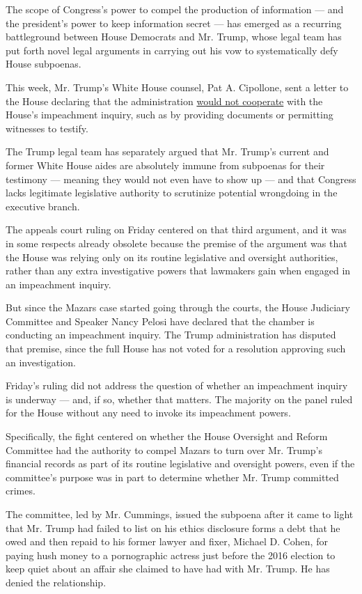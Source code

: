 The scope of Congress's power to compel the production of information
--- and the president's power to keep information secret --- has emerged
as a recurring battleground between House Democrats and Mr. Trump, whose
legal team has put forth novel legal arguments in carrying out his vow
to systematically defy House subpoenas.

This week, Mr. Trump's White House counsel, Pat A. Cipollone, sent a
letter to the House declaring that the administration
\href{https://www.nytimes3xbfgragh.onion/2019/10/08/us/politics/sondland-trump-ukraine-impeach.html}{would
not cooperate} with the House's impeachment inquiry, such as by
providing documents or permitting witnesses to testify.

The Trump legal team has separately argued that Mr. Trump's current and
former White House aides are absolutely immune from subpoenas for their
testimony --- meaning they would not even have to show up --- and that
Congress lacks legitimate legislative authority to scrutinize potential
wrongdoing in the executive branch.

The appeals court ruling on Friday centered on that third argument, and
it was in some respects already obsolete because the premise of the
argument was that the House was relying only on its routine legislative
and oversight authorities, rather than any extra investigative powers
that lawmakers gain when engaged in an impeachment inquiry.

But since the Mazars case started going through the courts, the House
Judiciary Committee and Speaker Nancy Pelosi have declared that the
chamber is conducting an impeachment inquiry. The Trump administration
has disputed that premise, since the full House has not voted for a
resolution approving such an investigation.

Friday's ruling did not address the question of whether an impeachment
inquiry is underway --- and, if so, whether that matters. The majority
on the panel ruled for the House without any need to invoke its
impeachment powers.

Specifically, the fight centered on whether the House Oversight and
Reform Committee had the authority to compel Mazars to turn over Mr.
Trump's financial records as part of its routine legislative and
oversight powers, even if the committee's purpose was in part to
determine whether Mr. Trump committed crimes.

The committee, led by Mr. Cummings, issued the subpoena after it came to
light that Mr. Trump had failed to list on his ethics disclosure forms a
debt that he owed and then repaid to his former lawyer and fixer,
Michael D. Cohen, for paying hush money to a pornographic actress just
before the 2016 election to keep quiet about an affair she claimed to
have had with Mr. Trump. He has denied the relationship.

